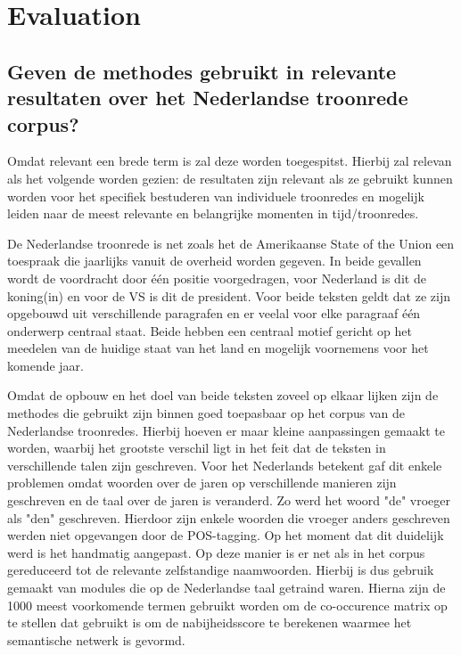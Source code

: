 \section{Evaluation}
\label{sec:eva}

\subsection{Geven de methodes gebruikt in \cite{state} relevante resultaten over het Nederlandse troonrede corpus?}

Omdat relevant een brede term is zal deze worden toegespitst. Hierbij zal  relevan als het volgende worden gezien: de resultaten zijn relevant als ze gebruikt kunnen worden voor het specifiek bestuderen van individuele troonredes en mogelijk leiden naar de meest relevante en belangrijke momenten in tijd/troonredes. 

De Nederlandse troonrede is net zoals het de Amerikaanse State of the Union een toespraak die jaarlijks vanuit de overheid worden gegeven. In beide gevallen wordt de voordracht door één positie voorgedragen, voor Nederland is dit de koning(in) en voor de VS is dit de president. Voor beide teksten geldt dat ze zijn opgebouwd uit verschillende paragrafen en er veelal voor elke paragraaf één onderwerp centraal staat. Beide hebben een centraal motief gericht op het meedelen van de huidige staat van het land en mogelijk voornemens voor het komende jaar.

Omdat de opbouw en het doel van beide teksten zoveel op elkaar lijken zijn de methodes die gebruikt zijn binnen \cite{state} goed toepasbaar op het corpus van de Nederlandse troonredes. Hierbij hoeven er maar kleine aanpassingen gemaakt te worden, waarbij het grootste verschil ligt in het feit dat de teksten in verschillende talen zijn geschreven. Voor het Nederlands betekent gaf dit enkele problemen omdat woorden over de jaren op verschillende manieren zijn geschreven en de taal over de jaren is veranderd. Zo werd het woord "de" vroeger als "den" geschreven. Hierdoor zijn enkele woorden die vroeger anders geschreven werden niet opgevangen door de POS-tagging. Op het moment dat dit duidelijk werd is het handmatig aangepast. Op deze manier is er net als in \cite{state} het corpus gereduceerd tot de relevante zelfstandige naamwoorden. Hierbij is dus gebruik gemaakt van modules die op de Nederlandse taal getraind waren. Hierna zijn de 1000 meest voorkomende termen gebruikt worden om de co-occurence matrix op te stellen dat gebruikt is om de nabijheidsscore te berekenen waarmee het semantische netwerk is gevormd.

